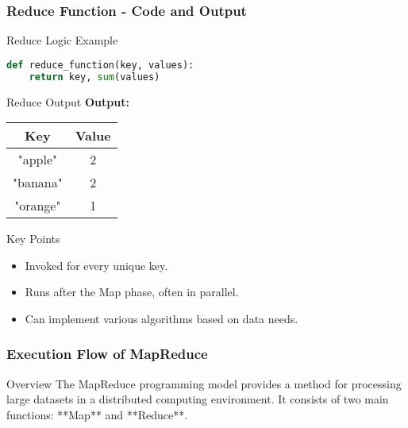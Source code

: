 \documentclass[aspectratio=169]{beamer}
\begin{document}
\begin{frame}[fragile]
    \frametitle{Reduce Function - Code and Output}
    \begin{block}{Reduce Logic Example}
        \begin{lstlisting}[language=Python]
def reduce_function(key, values):
    return key, sum(values)
        \end{lstlisting}
    \end{block}

    \begin{block}{Reduce Output}
        \textbf{Output:}
        \begin{tabular}{|c|c|}
            \hline
            Key & Value \\
            \hline
            "apple" & 2 \\
            "banana" & 2 \\
            "orange" & 1 \\
            \hline
        \end{tabular}
    \end{block}
    
    \begin{block}{Key Points}
        \begin{itemize}
            \item Invoked for every unique key.
            \item Runs after the Map phase, often in parallel.
            \item Can implement various algorithms based on data needs.
        \end{itemize}
    \end{block}
\end{frame}

\begin{frame}[fragile]
    \frametitle{Execution Flow of MapReduce}
    \begin{block}{Overview}
        The MapReduce programming model provides a method for processing large datasets in a distributed computing environment. 
        It consists of two main functions: **Map** and **Reduce**.
    \end{block}
\end{frame}
\end{document}
